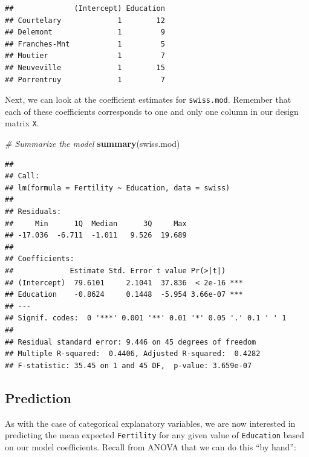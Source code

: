 \documentclass[
]{book}
\newenvironment{Shaded}{\begin{snugshade}}{\end{snugshade}}
\newcommand{\CommentTok}[1]{\textcolor[rgb]{0.56,0.35,0.01}{\textit{#1}}}
\newcommand{\KeywordTok}[1]{\textcolor[rgb]{0.13,0.29,0.53}{\textbf{#1}}}
\newcommand{\NormalTok}[1]{#1}
\newcommand{\OperatorTok}[1]{\textcolor[rgb]{0.81,0.36,0.00}{\textbf{#1}}}
\newcommand{\StringTok}[1]{\textcolor[rgb]{0.31,0.60,0.02}{#1}}
\begin{document}
\begin{verbatim}
##              (Intercept) Education
## Courtelary             1        12
## Delemont               1         9
## Franches-Mnt           1         5
## Moutier                1         7
## Neuveville             1        15
## Porrentruy             1         7
\end{verbatim}

Next, we can look at the coefficient estimates for \texttt{swiss.mod}. Remember that each of these coefficients corresponds to one and only one column in our design matrix \texttt{X}.

\begin{Shaded}
\begin{Highlighting}[]
\CommentTok{# Summarize the model}
\KeywordTok{summary}\NormalTok{(swiss.mod)}
\end{Highlighting}
\end{Shaded}

\begin{verbatim}
## 
## Call:
## lm(formula = Fertility ~ Education, data = swiss)
## 
## Residuals:
##     Min      1Q  Median      3Q     Max 
## -17.036  -6.711  -1.011   9.526  19.689 
## 
## Coefficients:
##             Estimate Std. Error t value Pr(>|t|)    
## (Intercept)  79.6101     2.1041  37.836  < 2e-16 ***
## Education    -0.8624     0.1448  -5.954 3.66e-07 ***
## ---
## Signif. codes:  0 '***' 0.001 '**' 0.01 '*' 0.05 '.' 0.1 ' ' 1
## 
## Residual standard error: 9.446 on 45 degrees of freedom
## Multiple R-squared:  0.4406,	Adjusted R-squared:  0.4282 
## F-statistic: 35.45 on 1 and 45 DF,  p-value: 3.659e-07
\end{verbatim}

\hypertarget{prediction-1}{%
\subsection{Prediction}\label{prediction-1}}

As with the case of categorical explanatory variables, we are now interested in predicting the mean expected \texttt{Fertility} for any given value of \texttt{Education} based on our model coefficients. Recall from ANOVA that we can do this ``by hand'':

\begin{Shaded}
\end{Shaded}
\end{document}
